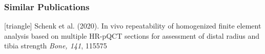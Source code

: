 \documentclass[xcolor=table]{beamer}
\begin{document}

\begin{frame}
	\frametitle{Similar Publications}
	\footnotesize{
		\begin{thebibliography}{99}
			[triangle]
			 Schenk et al. (2020).
			\newblock In vivo repeatability of homogenized finite element analysis based on multiple HR-pQCT sections for assessment of distal radius and tibia strength
			\newblock \textit{Bone, 141}, 115575
		\end{thebibliography}
	}
\end{frame}


\end{document}
